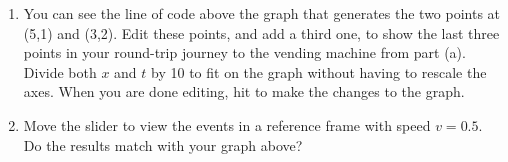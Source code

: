 \begin{enumerate}[labparts]
\item You can see the line of code above the graph that generates the two points at (5,1) and (3,2).  Edit these points, and add a third one, to show the last three points in your round-trip journey to the vending machine from part (a).  Divide both $x$ and $t$ by 10 to fit on the graph without having to rescale the axes.  When you are done editing, hit  to make the changes to the graph.

\item Move the slider to view the events in a reference frame with speed $v=0.5$.  Do the results match with your graph above?

\end{enumerate}

